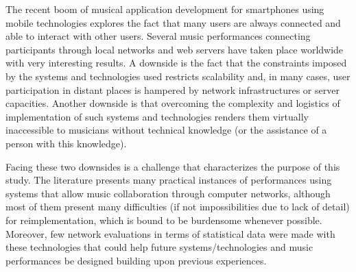 

The recent boom of musical application development for smartphones using mobile technologies explores the fact that many users are always connected and able to interact with other users. 
Several music performances connecting participants through local networks and web servers have taken place worldwide with very interesting results. 
A downside is the fact that the constraints imposed by the systems and technologies used restricts scalability and, in many cases, user participation in distant places is hampered by network infrastructures or server capacities. 
Another downside is that overcoming the complexity and logistics of implementation of such systems and technologies renders them virtually inaccessible to musicians without technical knowledge (or the assistance of a person with this knowledge).

Facing these two downsides is a challenge that characterizes the purpose of this study.
The literature presents many practical instances of performances using systems that allow music collaboration through computer networks, although most of them present many difficulties (if not impossibilities due to lack of detail) for reimplementation, which is bound to be burdensome whenever possible.
Moreover, few network evaluations in terms of statistical data were made with these technologies that could help future systems/technologies and music performances be designed building upon previous experiences.

